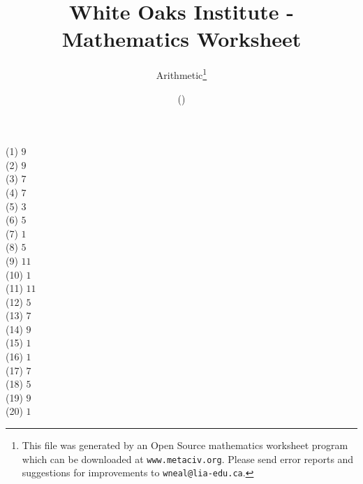 \documentclass[letter]{article}
\begin{document}
\title{White Oaks Institute - Mathematics Worksheet}
\author{Arithmetic\thanks{This file was generated by an \textsf{Open Source} mathematics worksheet program which can be downloaded at \texttt{www.metaciv.org}. Please send error reports and suggestions for improvements to \texttt{wneal@lia-edu.ca}.}}
\date{\XCfileversion{} (\XCfiledate)}
\maketitle
\begin{multicols}{2}(1) $9$\\(2) $9$\\(3) $7$\\(4) $7$\\(5) $3$\\(6) $5$\\(7) $1$\\(8) $5$\\(9) $11$\\(10) $1$\\(11) $11$\\(12) $5$\\(13) $7$\\(14) $9$\\(15) $1$\\(16) $1$\\(17) $7$\\(18) $5$\\(19) $9$\\(20) $1$\end{multicols}
\end{document}
